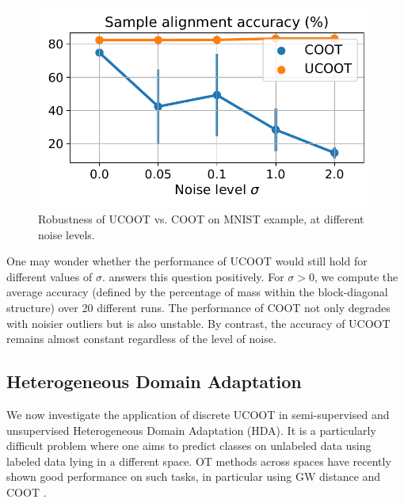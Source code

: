 \setlength{\intextsep}{0pt}
\begin{figure}
    \centering
    \vspace{-12pt}
    \includegraphics[width=\linewidth]{./Chapitre3/fig/mnist-sigma.pdf}
    \vspace*{-9mm}
    \caption{Robustness of UCOOT vs. COOT on MNIST example, at different noise levels.
    \label{f:mnist-sigma}}
\end{figure}
One may wonder whether the performance of UCOOT would still hold for different values of $\sigma$.
 answers this question positively.
For $\sigma > 0$, we compute the average accuracy
(defined by the percentage of mass within the block-diagonal structure) over 20 different runs.
The performance of COOT not only degrades with noisier outliers but is also unstable.
By contrast, the accuracy of UCOOT remains almost constant regardless of the level of noise.

\subsection{Heterogeneous Domain Adaptation}

We now investigate the application of discrete UCOOT in semi-supervised and unsupervised
Heterogeneous Domain Adaptation (HDA). It is a particularly difficult problem where
one aims to predict classes on unlabeled data using labeled data lying in a different space.
OT methods across spaces have recently shown good performance on such tasks,
in particular using GW distance \citep{Yan18} and COOT \citep{Redko20}.

